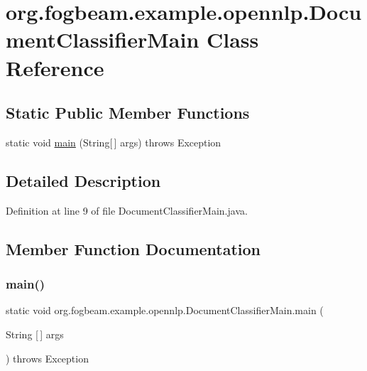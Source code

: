 \hypertarget{classorg_1_1fogbeam_1_1example_1_1opennlp_1_1_document_classifier_main}{}\section{org.\+fogbeam.\+example.\+opennlp.\+Document\+Classifier\+Main Class Reference}
\label{classorg_1_1fogbeam_1_1example_1_1opennlp_1_1_document_classifier_main}
\subsection*{Static Public Member Functions}
\begin{DoxyCompactItemize}
\item 
static void \hyperlink{classorg_1_1fogbeam_1_1example_1_1opennlp_1_1_document_classifier_main_ab612b2c0777286a7c3e8a63c64c822fe}{main} (String\mbox{[}$\,$\mbox{]} args)  throws Exception 	
\end{DoxyCompactItemize}


\subsection{Detailed Description}


Definition at line 9 of file Document\+Classifier\+Main.\+java.



\subsection{Member Function Documentation}
\hypertarget{classorg_1_1fogbeam_1_1example_1_1opennlp_1_1_document_classifier_main_ab612b2c0777286a7c3e8a63c64c822fe}{}\label{classorg_1_1fogbeam_1_1example_1_1opennlp_1_1_document_classifier_main_ab612b2c0777286a7c3e8a63c64c822fe} 
\subsubsection{\texorpdfstring{main()}{main()}}
{\footnotesize\ttfamily static void org.\+fogbeam.\+example.\+opennlp.\+Document\+Classifier\+Main.\+main (\begin{DoxyParamCaption}\item[{String \mbox{[}$\,$\mbox{]}}]{args }\end{DoxyParamCaption}) throws Exception\hspace{0.3cm}{\ttfamily [static]}}



